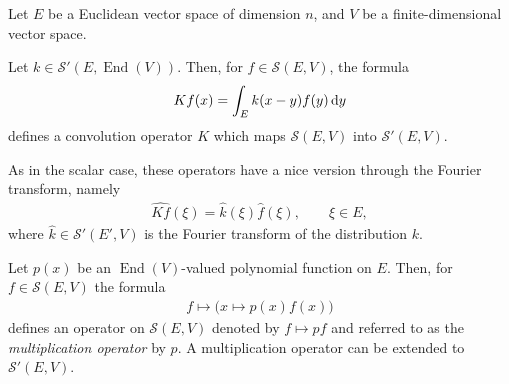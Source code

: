 \documentclass[10pt,a4paper]{amsart}
\DeclareMathOperator{\End}{End}
\numberwithin{equation}{section}
\begin{document}
Let $E$ be a Euclidean vector space of dimension $n$, and $V$ be a finite-dimensional vector space.

Let $k\in \mathcal S'(E,\End(V))$. Then, for $f\in \mathcal S(E,V)$, the formula
\begin{gather*}
Kf(x) = \int_E k(x-y) f(y)\,{\rm d}y
\end{gather*}
defines a convolution operator $K$ which maps $\mathcal S(E,V)$ into $\mathcal S'(E,V)$.

As in the scalar case, these operators have a nice version through the Fourier transform, namely
\begin{gather*}
\widehat {Kf} (\xi) = \widehat k (\xi) \widehat f(\xi), \qquad \xi\in E ,
\end{gather*}
where $\widehat k \in \mathcal S'(E',V)$ is the Fourier transform of the distribution $k$.

Let $p(x)$ be an $\End(V)$-valued polynomial function on $E$. Then, for $f\in \mathcal S(E,V)$ the formula
\begin{gather*}
f \mapsto \big(x\mapsto p(x) f(x)\big)
\end{gather*}
defines an operator on $\mathcal S(E,V)$
 denoted by $f\mapsto pf$ and referred to as the \emph{multiplication operator} by
$p$. A multiplication operator can be extended to $\mathcal S'(E,V)$.
\end{document}
